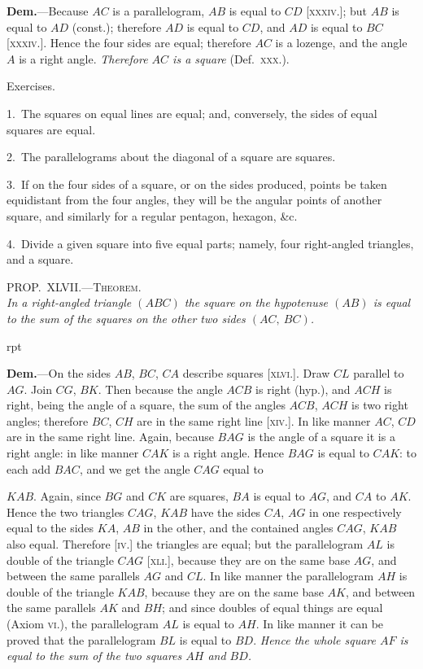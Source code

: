 \documentclass[oneside]{book}
\newcounter{wrapwidth}
\newcommand\myprop[2]{
\bigskip\Needspace*{4\baselineskip}\begin{center}\textsc{#1}\\\medskip\emph{#2}\par\end{center}
}
\newcommand\exhead[1]{
\Needspace*{5\baselineskip}\begin{center}
\textsf{#1}
\end{center}
}
\newcommand\imgflow[3]{
\setcounter{wrapwidth}{#1}

\begin{wrapfigure}[#2]{r}{\value{wrapwidth}pt}
\begin{center}
\vspace{-0.3in}

\end{center}
\end{wrapfigure}
}
\begin{document}
\textbf{Dem.}---Because $AC$ is a parallelogram,
$AB$ is equal to $CD$ [\textsc{xxxiv}.];
but $AB$ is equal to $AD$ (const.); therefore
$AD$ is equal to $CD$, and $AD$ is
equal to $BC$ [\textsc{xxxiv}.]. Hence the four sides are equal;
therefore $AC$ is a lozenge, and the angle $A$ is a right
angle. \emph{Therefore $AC$ is a square} (Def.~\textsc{xxx}.).




\exhead{Exercises.}

\begin{footnotesize}
1.~The squares on equal lines are equal; and, conversely, the
sides of equal squares are equal.

2.~The parallelograms about the diagonal of a square are
squares.

3.~If on the four sides of a square, or on the sides produced,
points be taken equidistant from the four angles, they will be the
angular points of another square, and similarly for a regular
pentagon, hexagon, \&c.

4.~Divide a given square into five equal parts; namely, four
right-angled triangles, and a square.
\par\end{footnotesize}


\myprop{PROP\@.~XLVII\@.---Theorem.}{In a right-angled triangle $(ABC)$ the square on the
hypotenuse $(AB)$ is equal to the sum of the squares on the other two sides $(AC,\ BC)$.}


\imgflow{175}{15}{f068}

\textbf{Dem.}---On the sides $AB$, $BC$, $CA$ describe squares
[\textsc{xlvi}.]. Draw $CL$ parallel
to $AG$. Join $CG$,
$BK$. Then because the
angle $ACB$ is right
(hyp.), and $ACH$ is
right, being the angle
of a square, the sum of
the angles $ACB$, $ACH$
is two right angles;
therefore $BC$, $CH$ are
in the same right line
[\textsc{xiv}.]. In like manner
$AC$, $CD$ are in the
same right line. Again,
because $BAG$ is the
angle of a square it is a right angle: in like manner
$CAK$ is a right angle. Hence $BAG$ is equal to $CAK$:
to each add $BAC$, and we get the angle $CAG$ equal to

$KAB$. Again, since $BG$ and $CK$ are squares, $BA$ is
equal to $AG$, and $CA$ to $AK$. Hence the two triangles
$CAG$, $KAB$ have the sides $CA$, $AG$ in one respectively
equal to the sides $KA$, $AB$ in the other, and the contained
angles $CAG$, $KAB$ also equal. Therefore [\textsc{iv}.]
the triangles are equal; but the parallelogram $AL$ is
double of the triangle $CAG$ [\textsc{xli}.], because they are on
the same base $AG$, and between the same parallels $AG$
and $CL$. In like manner the parallelogram
$AH$ is double
of the triangle $KAB$, because they are on the same base
$AK$, and between the same parallels $AK$ and $BH$; and
since doubles of equal things are equal (Axiom \textsc{vi}.),
the parallelogram $AL$ is equal to $AH$. In like manner
it can be proved that the parallelogram $BL$ is equal to
$BD$. \emph{Hence the whole square $AF$ is equal to the sum of
the two squares $AH$ and $BD$.}\par\newpage 
\end{document}
